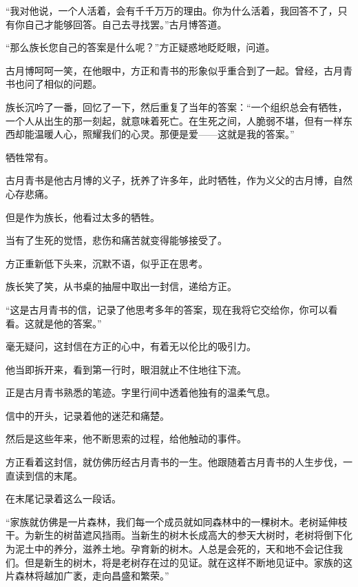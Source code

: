 
\begin{this_body}



“我对他说，一个人活着，会有千千万万的理由。你为什么活着，我回答不了，只有你自己才能够回答。自己去寻找罢。”古月博答道。

“那么族长您自己的答案是什么呢？”方正疑惑地眨眨眼，问道。

古月博呵呵一笑，在他眼中，方正和青书的形象似乎重合到了一起。曾经，古月青书也问了相似的问题。

族长沉吟了一番，回忆了一下，然后重复了当年的答案：“一个组织总会有牺牲，一个人从出生的那一刻起，就意味着死亡。在生死之间，人脆弱不堪，但有一样东西却能温暖人心，照耀我们的心灵。那便是爱——这就是我的答案。”

牺牲常有。

古月青书是他古月博的义子，抚养了许多年，此时牺牲，作为义父的古月博，自然心存悲痛。

但是作为族长，他看过太多的牺牲。

当有了生死的觉悟，悲伤和痛苦就变得能够接受了。

方正重新低下头来，沉默不语，似乎正在思考。

族长笑了笑，从书桌的抽屉中取出一封信，递给方正。

“这是古月青书的信，记录了他思考多年的答案，现在我将它交给你，你可以看看。这就是他的答案。”

毫无疑问，这封信在方正的心中，有着无以伦比的吸引力。

他当即拆开来，看到第一行时，眼泪就止不住地往下流。

正是古月青书熟悉的笔迹。字里行间中透着他独有的温柔气息。

信中的开头，记录着他的迷茫和痛楚。

然后是这些年来，他不断思索的过程，给他触动的事件。

方正看着这封信，就仿佛历经古月青书的一生。他跟随着古月青书的人生步伐，一直读到信的末尾。

在末尾记录着这么一段话。

“家族就仿佛是一片森林，我们每一个成员就如同森林中的一棵树木。老树延伸枝干。为新生的树苗遮风挡雨。当新生的树木长成高大的参天大树时，老树将倒下化为泥土中的养分，滋养土地。孕育新的树木。人总是会死的，天和地不会记住我们。但是新生的树木，将是老树存在过的见证。就在这样不断地见证中。家族的这片森林将越加广袤，走向昌盛和繁荣。”


\end{this_body}
